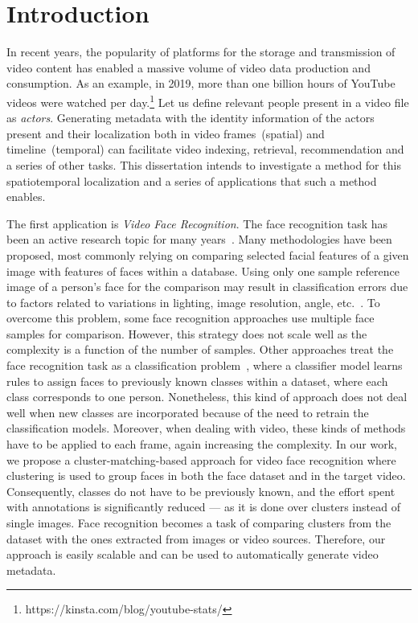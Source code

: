 \section{Introduction}

In recent years, the popularity of platforms for the storage and transmission of video content has enabled a massive volume of video data production and consumption.
As an example, in 2019, more than one billion hours of YouTube videos were watched per day.\footnote{https://kinsta.com/blog/youtube-stats/}
Let us define relevant people present in a video file as \emph{actors}.
Generating metadata with the identity information of the actors present and their localization both in video frames~(spatial) and timeline~(temporal) can facilitate video indexing, retrieval, recommendation and a series of other tasks.
This dissertation intends to investigate a method for this spatiotemporal localization and a series of applications that such a method enables. 



The first application is \emph{Video Face Recognition}.
The face recognition task has been an active research topic for many years~\cite{survey66}.
Many methodologies have been proposed, most commonly relying on comparing selected facial features of a given image with features of faces within a database.
Using only one sample reference image of a person's face for the comparison may result in classification errors due to factors related to variations in lighting, image resolution, angle, etc.~\cite{598229}.
To overcome this problem, some face recognition approaches use multiple face samples for comparison. However, this strategy does not scale well as the complexity is a function of the number of samples.
Other approaches treat the face recognition task as a classification problem~\cite{dadi2016improved, ghosal}, where a classifier model learns rules to assign faces to previously known classes within a dataset, where each class corresponds to one person.
Nonetheless, this kind of approach does not deal well when new classes are incorporated because of the need to retrain the classification models.
Moreover, when dealing with video, these kinds of methods have to be applied to each frame, again increasing the complexity.
In our work, we propose a cluster-matching-based approach for video face recognition where clustering is used to group faces in both the face dataset and in the target video.
Consequently, classes do not have to be previously known, and the effort spent with annotations is significantly reduced --- as it is done over clusters instead of single images.
Face recognition becomes a task of comparing clusters from the dataset with the ones extracted from images or video sources.
Therefore, our approach is easily scalable and can be used to automatically generate video metadata. 


